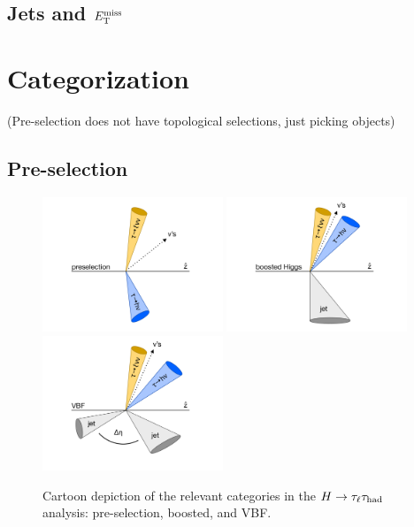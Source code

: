 \subsection{Jets and $E_{\mathrm{T}}^{\mathrm{miss}}$}
\label{sec:strategy-hadronic}

\section{Categorization}
\label{sec:strategy-categorization}

(Pre-selection does not have topological selections, just picking objects)

\subsection{Pre-selection}
\label{sec:strategy-preselection}

\begin{figure}[tp]
  \centering
  \includegraphics[width=0.48\textwidth]{figures/category-cartoons/presel}
  \includegraphics[width=0.48\textwidth]{figures/category-cartoons/boost}
  \includegraphics[width=0.48\textwidth]{figures/category-cartoons/vbf}
  \caption{Cartoon depiction of the relevant categories in the $H\rightarrow\tau_\ell\tau_\text{had}$ analysis: pre-selection, boosted, and VBF.}
  \label{fig:strategy-category-cartoons}
\end{figure}

